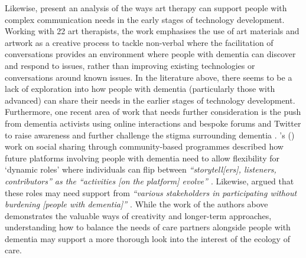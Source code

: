 Likewise, \cite{lazar2018making} present an analysis of the ways art therapy can support people with complex communication needs in the early stages of technology development. Working with 22 art therapists, the work emphasises the use of art materials and artwork as a creative process to tackle non-verbal where the facilitation of conversations provides an environment where people with dementia can discover and respond to issues, rather than improving existing technologies or conversations around known issues. In the literature above, there seems to be a lack of exploration into how people with dementia (particularly those with advanced) can share their needs in the earlier stages of technology development. Furthermore, one recent area of work that needs further consideration is the push from dementia activists using online interactions and bespoke forums and Twitter to raise awareness and further challenge the stigma surrounding dementia \citep{talbot_how_2020}. \citeauthor{dai2020making}'s (\citeyear{dai2020making}) work on social sharing through community-based programmes described how future platforms involving people with dementia need to allow flexibility for `dynamic roles' where individuals can flip between \textit{``storytell[ers], listeners, contributors'' as the ``activities [on the platform] evolve'' \citep[pg. 10]{dai2020making}}. Likewise, \cite{johnson2020roles} argued that these roles may need support from \textit{``various stakeholders in participating without burdening [people with dementia]'' \citep[p.127]{johnson2020roles}}. While the work of the authors above demonstrates the valuable ways of creativity and longer-term approaches, understanding how to balance the needs of care partners alongside people with dementia may support a more thorough look into the interest of the ecology of care. 

